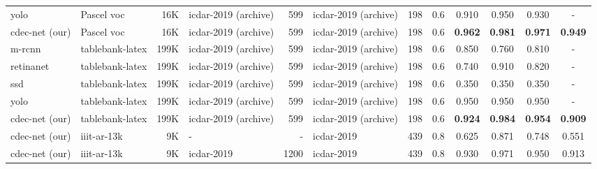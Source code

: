 \documentclass[a4paper,conference]{IEEEtran}
\begin{document}
\begin{table*}
\begin{center}
\begin{tabular}{|l| l | r|l |r|l|r| c| c c c c|}
{\sc yolo}~\cite{casado2019benefits} &Pascel {\sc voc} &16K &{\sc icdar}-2019 (archive) &599 &{\sc icdar}-2019 (archive) &198 &0.6 &0.910 &0.950 &0.930 &- \\ 
{\sc cd}e{\sc c-n}et (our) &Pascel {\sc voc} &16K &{\sc icdar}-2019 (archive) &599 &{\sc icdar}-2019 (archive) &198 &0.6 &\textbf{0.962} &\textbf{0.981} &\textbf{0.971} &\textbf{0.949} \\ 
\hhline{|=|=|=|=|=|=|=|=|====|} 
{\sc m-rcnn}~\cite{casado2019benefits} &{\sc t}able{\sc b}ank-{\sc l}a{\sc t}e{\sc x} &199K &{\sc icdar}-2019 (archive) &599 &{\sc icdar}-2019 (archive) &198 &0.6 &0.850 &0.760 &0.810 &- \\ 
{\sc r}etina{\sc n}et~\cite{casado2019benefits} &{\sc t}able{\sc b}ank-{\sc l}a{\sc t}e{\sc x} &199K &{\sc icdar}-2019 (archive) &599 &{\sc icdar}-2019 (archive) &198 &0.6 &0.740 &0.910 &0.820 &- \\ 
{\sc ssd}~\cite{casado2019benefits} &{\sc t}able{\sc b}ank-{\sc l}a{\sc t}e{\sc x} &199K &{\sc icdar}-2019 (archive) &599 &{\sc icdar}-2019 (archive) &198 &0.6 &0.350 &0.350 &0.350 &- \\ 
{\sc yolo}~\cite{casado2019benefits} &{\sc t}able{\sc b}ank-{\sc l}a{\sc t}e{\sc x} &199K &{\sc icdar}-2019 (archive) &599 &{\sc icdar}-2019 (archive) &198 &0.6 &0.950 &0.950 &0.950 &- \\  
{\sc cd}e{\sc c-n}et (our) &{\sc t}able{\sc b}ank-{\sc l}a{\sc t}e{\sc x} &199K &{\sc icdar}-2019 (archive) &599 &{\sc icdar}-2019 (archive) &198 &0.6 &\textbf{0.924} &\textbf{0.984} &\textbf{0.954} &\textbf{0.909} \\ \hhline{|=|=|=|=|=|=|=|=|====|}
{\sc cd}e{\sc c-n}et (our) &{\sc iiit-ar-13k} &9K &- &- &{\sc icdar}-2019 &439 &0.8 & 0.625 &0.871 &0.748 &0.551 \\
{\sc cd}e{\sc c-n}et (our) &{\sc iiit-ar-13k} &9K &{\sc icdar}-2019 &1200 &{\sc icdar}-2019 &439 &0.8 &0.930 &0.971 &0.950 &0.913 \\ \hline
\end{tabular}
\end{center}
\caption{Illustrates comparison between the proposed {\sc cd}e{\sc c-n}et and state-of-the-art techniques on {\sc icdar-2019} dataset. {\sc cd}e{\sc c-n}et\textbf{:} indicates a single  model which is trained with {\sc iiit-ar-13k} dataset. \label{table_icdar_2019}}
\end{table*}
\end{document}

